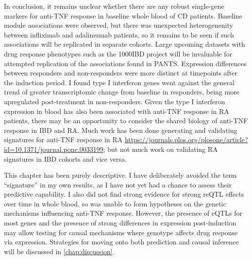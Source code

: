 \begin{outline}
In conclusion,
it remains unclear whether there are any robust single-gene markers for anti-\gls{TNF} response in baseline whole blood of \gls{CD} patients.
Baseline module associations were observed, but there was unexpected heterogenenity between infliximab and adalimumab patients,
so it remains to be seen if such associations will be replicated in separate cohorts.
Large upcoming datasets with drug response phenotypes such as the 1000IBD project\autocite{imhann20191000IBDProjectMultiomics} will be invaluable for attempted replication of the associations found in \gls{PANTS}.
Expression differences between responders and non-responders were more distinct at timepoints after the induction period.
I found type I interferon genes went against the general trend of greater transcriptomic change from baseline in responders,
being more upregulated post-treatment in non-responders.
Given the type I interferon expression in blood has also been associated with anti-\gls{TNF} response in \gls{RA} patients,
there may be an opportunity to consider the shared biology of anti-\gls{TNF} response in \gls{IBD} and \gls{RA}.
Much work has been done generating and validating signatures for anti-\gls{TNF} response in \gls{RA} \url{https://journals.plos.org/plosone/article?id=10.1371/journal.pone.0033199}; but not much work on validating \gls{RA} signatures in \gls{IBD} cohorts and vice versa.

This chapter has been purely descriptive.
I have deliberately avoided the term \enquote{signature} in my own results, 
as I have not yet had a chance to assess their predictive capability.
I also did not find strong evidence for strong \gls{reQTL} effects over time in whole blood, 
so was unable to form hypotheses on the genetic mechanisms influencing anti-\gls{TNF} response.
However, the presence of \glspl{eQTL} for most genes and the presence of strong differences in expression post-induction may allow testing for causal mechanisms where genotype affects drug response via expression.
Strategies for moving onto both prediction and causal inference will be discussed in \autoref{chap:discussion}.


\end{outline}
